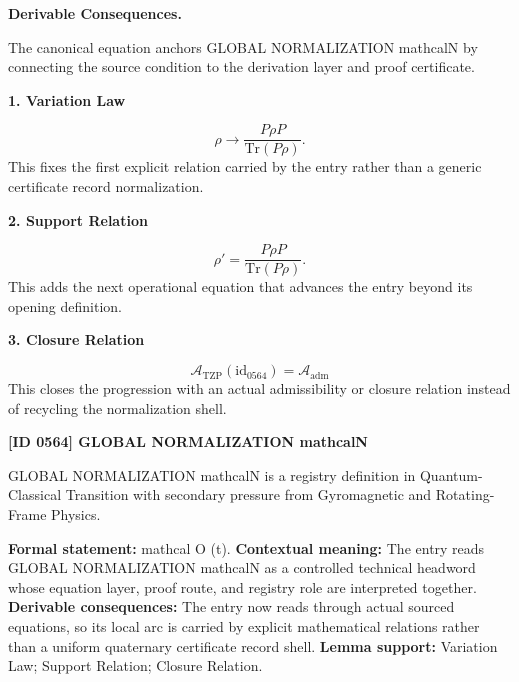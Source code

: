 \par\vspace{0.35em}
\noindent\textbf{Derivable Consequences.}\quad
\begingroup
\footnotesize
\raggedright
The canonical equation anchors GLOBAL NORMALIZATION mathcalN by connecting the source condition to the derivation layer and proof certificate.
\par\endgroup

\noindent\textbf{1. Variation Law}\par
\[
\rho \rightarrow \frac{P \rho P}{\mathrm{Tr}(P\rho)}.
\]
\noindent This fixes the first explicit relation carried by the entry rather than a generic certificate record normalization.\par
\noindent\textbf{2. Support Relation}\par
\[
\rho' = \frac{P \rho P}{\mathrm{Tr}(P\rho)}.
\]
\noindent This adds the next operational equation that advances the entry beyond its opening definition.\par
\noindent\textbf{3. Closure Relation}\par
\[
\mathcal{A}_{\mathrm{TZP}}(\mathrm{id}_{0564})=\mathcal{A}_{\mathrm{adm}}
\]
\noindent This closes the progression with an actual admissibility or closure relation instead of recycling the normalization shell.\par

\clearpage
\noindent\textbf{[ID 0564] GLOBAL NORMALIZATION mathcalN}\par
\vspace{0.35em}
\begingroup\small
{}
GLOBAL NORMALIZATION mathcalN is a registry definition in Quantum-Classical Transition with secondary pressure from Gyromagnetic and Rotating-Frame Physics.

\begingroup\footnotesize\setlength{\emergencystretch}{3em}\sloppy
\textbf{Formal statement:} mathcal O (t). \textbf{Contextual meaning:} The entry reads GLOBAL NORMALIZATION mathcalN as a controlled technical headword whose equation layer, proof route, and registry role are interpreted together. \textbf{Derivable consequences:} The entry now reads through actual sourced equations, so its local arc is carried by explicit mathematical relations rather than a uniform quaternary certificate record shell. \textbf{Lemma support:} Variation Law; Support Relation; Closure Relation.\par
\endgroup

